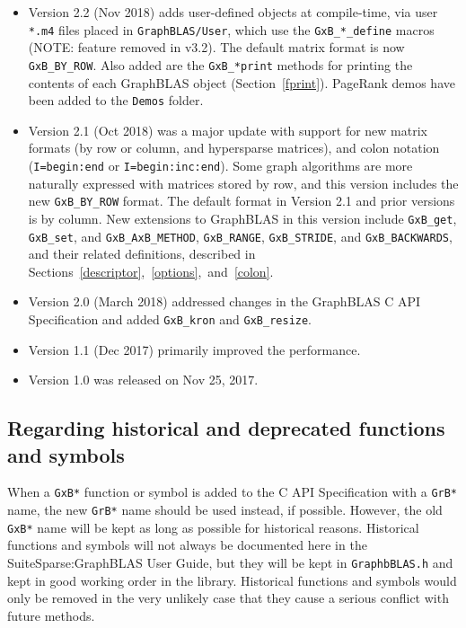 \begin{itemize}
\item
Version 2.2 (Nov 2018)
adds user-defined objects at compile-time, via user \verb'*.m4' files placed in
\verb'GraphBLAS/User', which use the \verb'GxB_*_define' macros
(NOTE: feature removed in v3.2).
The default matrix format is now \verb'GxB_BY_ROW'.
Also added are the \verb'GxB_*print' methods for printing the contents of each
GraphBLAS object (Section~\ref{fprint}).   PageRank demos have been added to
the \verb'Demos' folder.

\item
Version 2.1 (Oct 2018) was
a major update with support for new matrix formats
(by row or column, and hypersparse matrices), and colon notation
(\verb'I=begin:end' or \verb'I=begin:inc:end').  Some graph algorithms are more
naturally expressed with matrices stored by row, and this version includes the
new \verb'GxB_BY_ROW' format.  The default format in Version 2.1 and
prior versions is by column.
New extensions to GraphBLAS in this version include \verb'GxB_get',
\verb'GxB_set', and \verb'GxB_AxB_METHOD', \verb'GxB_RANGE', \verb'GxB_STRIDE',
and \verb'GxB_BACKWARDS', and their related definitions, described in
Sections~\ref{descriptor},~\ref{options},~and~\ref{colon}.

\item
Version 2.0 (March 2018) addressed changes in the GraphBLAS C API
Specification and added \verb'GxB_kron' and \verb'GxB_resize'.

\item
Version 1.1 (Dec 2017) primarily improved the performance.

\item
Version 1.0 was released on Nov 25, 2017.
\end{itemize}

\subsection{Regarding historical and deprecated functions and symbols}

When a \verb'GxB*' function or symbol is added to the C API Specification with
a \verb'GrB*' name, the new \verb'GrB*' name should be used instead, if
possible.  However, the old \verb'GxB*' name will be kept as long as possible
for historical reasons.  Historical functions and symbols will not always be
documented here in the SuiteSparse:GraphBLAS User Guide, but they will be kept
in \verb'GraphbBLAS.h' and kept in good working order in the library.
Historical functions and symbols would only be removed in the very unlikely
case that they cause a serious conflict with future methods.

